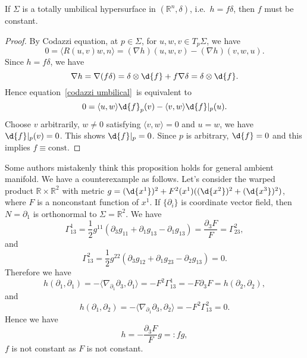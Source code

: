 \begin{prop}
    If $\Sigma$ is a totally umbilical hypersurface in $(\mathbb{R}^n,\delta)$, i.e.\ $h=f\delta$, then $f$ must be constant.
\end{prop}
\begin{proof}
    By Codazzi equation, at $p\in\Sigma$, for $u,w,v\in T_p\Sigma$, we have
    \begin{equation}
        0=\langle R(u,v)w,n\rangle=(\nabla h)(u,w,v)-(\nabla h)(v,w,u).\label{codazzi umbilical}
    \end{equation}
    Since $h=f\delta$, we have
    \[\nabla h=\nabla (f\delta)=\delta\otimes\d{f}+f\nabla\delta=\delta\otimes\d{f}.\]
    Hence equation~\ref{codazzi umbilical}~is equivalent to
    \[0=\langle u,w\rangle\d{f}_p(v)-\langle v,w\rangle\d{f}|_p(u).\]
    Choose $v$ arbitrarily, $w\neq 0$ satisfying $\langle v,w\rangle=0$ and $u=w$, we have $\d{f}|_p(v)=0$.
    This shows $\d{f}|_p=0$.
    Since $p$ is arbitrary, $\d{f}=0$ and this implies $f\equiv\text{const}$. 
\end{proof}

\begin{rem}
    Some authors mistakenly think this proposition holds for general ambient manifold.
    We have a counterexample as follows.
    Let's consider the warped product $\mathbb{R}\times\mathbb{R}^2$ with metric $g=(\d{x^1})^2+F^2(x^1)((\d{x^2})^2+(\d{x^3})^2)$, where $F$ is a nonconstant function of $x^1$.
    If $\{\partial_i\}$ is coordinate vector field, then $N=\partial_1$ is orthonormal to $\Sigma=\mathbb{R}^2$.
    We have
    \[\Gamma^1_{13}=\frac{1}{2}g^{11}(\partial_3g_{11}+\partial_1g_{13}-\partial_1g_{13})=\frac{\partial_3F}{F}=\Gamma^2_{23},\]
    and
    \[\Gamma^2_{13}=\frac{1}{2}g^{22}(\partial_3g_{12}+\partial_1g_{23}-\partial_2g_{13})=0.\]
    Therefore we have
    \[h(\partial_1,\partial_1)=-\langle\nabla_{\partial_1}\partial_3,\partial_1\rangle=-F^2\Gamma^1_{13}=-F\partial_3F=h(\partial_2,\partial_2),\]
    and
    \[h(\partial_1,\partial_2)=-\langle\nabla_{\partial_1}\partial_3,\partial_2\rangle=-F^2\Gamma^2_{13}=0.\]
    Hence we have
    \[h=-\frac{\partial_3F}{F}g=:fg,\]
    $f$ is not constant as $F$ is not constant.
\end{rem}

